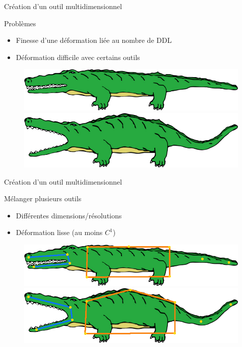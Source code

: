 \documentclass[xcolor=x11names,compress]{beamer}
\renewcommand{\(}{\begin{columns}} \renewcommand{\)}{\end{columns}}
\newcommand{\<}[1]{\begin{column}{#1}} \renewcommand{\>}{\end{column}}
\begin{document}
\begin{frame}{Création d'un outil multidimensionnel}
  \begin{alertblock}{Problèmes}
    \begin{itemize}
    \item Finesse d'une déformation liée au nombre de DDL
    \item Déformation difficile avec certains outils
    \end{itemize}
  \end{alertblock}
  \begin{figure}[h]
    \begin{center}
      \includegraphics[scale=0.15]{alligator-ferme}
      \includegraphics[scale=0.15]{alligator-ouvert}
    \end{center}
    \caption{\cite{JBPS11}}
  \end{figure}
\end{frame}

\begin{frame}{Création d'un outil multidimensionnel}
  \begin{block}{Mélanger plusieurs outils}
    \begin{itemize}
    \item Différentes dimensions/résolutions
    \item Déformation lisse (au moins $C^1$)
    \end{itemize}
  \end{block}
  \begin{figure}[h]
    \begin{center}
      \includegraphics[scale=0.15]{alligator-avant}
      \includegraphics[scale=0.15]{alligator-apres}
    \end{center}
    \caption{\cite{JBPS11}}
  \end{figure}
\end{frame}
\end{document}
